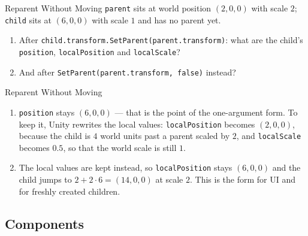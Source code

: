 \begin{exerciseframe}{Reparent Without Moving}
    \texttt{parent} sits at world position $(2, 0, 0)$ with scale $2$;
    \texttt{child} sits at $(6, 0, 0)$ with scale $1$ and has no parent yet.
    \vspace{1ex}

    \begin{enumerate}
        \item After \texttt{child.transform.SetParent(parent.transform)}: what are
        the child's \texttt{position}, \texttt{localPosition} and
        \texttt{localScale}?
        \item And after \texttt{SetParent(parent.transform, false)} instead?
    \end{enumerate}
\end{exerciseframe}

\begin{solutionframe}{Reparent Without Moving}
    \begin{enumerate}
        \item \texttt{position} stays $(6, 0, 0)$ --- that is the point of the
        one-argument form. To keep it, Unity rewrites the local values:
        \texttt{localPosition} becomes $(2, 0, 0)$, because the child is $4$
        world units past a parent scaled by $2$, and \texttt{localScale}
        becomes $0.5$, so that the world scale is still $1$.
        \item The local values are kept instead, so \texttt{localPosition} stays
        $(6, 0, 0)$ and the child jumps to $2 + 2 \cdot 6 = (14, 0, 0)$ at
        scale $2$. This is the form for UI and for freshly created children.
    \end{enumerate}
\end{solutionframe}

\subsection{Components}

